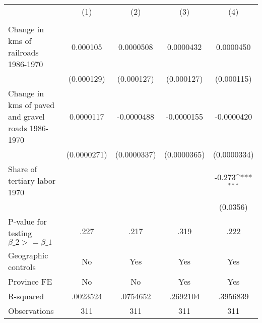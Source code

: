 {
\def\sym#1{\ifmmode^{#1}\else\(^{#1}\)\fi}
\begin{tabular}{l*{4}{c}}
\hline\hline
                &\multicolumn{1}{c}{(1)}&\multicolumn{1}{c}{(2)}&\multicolumn{1}{c}{(3)}&\multicolumn{1}{c}{(4)}\\
                &\multicolumn{1}{c}{}&\multicolumn{1}{c}{}&\multicolumn{1}{c}{}&\multicolumn{1}{c}{}\\
\hline
Change in kms of railroads 1986-1970& 0.000105         &0.0000508         &0.0000432         &0.0000450         \\
                &(0.000129)         &(0.000127)         &(0.000127)         &(0.000115)         \\
[1em]
Change in kms of paved and gravel roads 1986-1970&0.0000117         &-0.0000488         &-0.0000155         &-0.0000420         \\
                &(0.0000271)         &(0.0000337)         &(0.0000365)         &(0.0000334)         \\
[1em]
Share of tertiary labor 1970&                  &                  &                  &   -0.273\sym{***}\\
                &                  &                  &                  & (0.0356)         \\
\hline
P-value for testing $\beta\_{2} >= \beta\_{1}$&     .227         &     .217         &     .319         &     .222         \\
Geographic controls&       No         &      Yes         &      Yes         &      Yes         \\
Province FE     &       No         &       No         &      Yes         &      Yes         \\
R-squared       & .0023524         & .0754652         & .2692104         & .3956839         \\
Observations    &      311         &      311         &      311         &      311         \\
\hline\hline
\end{tabular}
}
